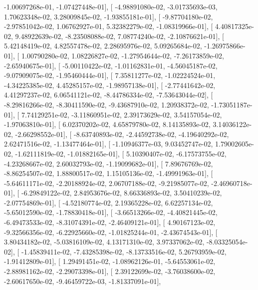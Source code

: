 \documentclass{article}
\begin{document}
         -1.00697268e-01,  -1.07427448e-01],
       [ -4.98891080e-02,  -3.01735693e-03,   1.70623348e-02,
          3.28009845e-02,  -1.93855181e-01],
       [ -9.87704180e-02,  -2.97851042e-02,   1.06762927e-01,
          5.32382279e-02,  -1.08319966e-01],
       [  4.40817325e-02,   9.48922639e-02,  -8.23508088e-02,
          7.08774240e-02,  -2.10876621e-01],
       [  5.42148419e-02,   4.82557478e-02,   2.28695976e-02,
          5.09265684e-02,  -1.26975866e-01],
       [  1.00790280e-02,   1.08226827e-02,  -1.27954644e-02,
         -7.26173859e-02,  -2.65940675e-01],
       [ -5.00110422e-02,  -1.01162831e-01,  -4.56045187e-02,
         -9.07909075e-02,  -1.95460444e-01],
       [  7.35811277e-02,  -1.02224524e-01,  -4.34225385e-02,
          4.45285157e-02,  -1.98957138e-01],
       [ -2.77441642e-02,   4.41297237e-02,   6.06541121e-02,
         -8.44786334e-02,  -7.53643044e-02],
       [ -8.29816266e-02,  -8.30411590e-02,  -9.43687910e-02,
          1.20938372e-02,  -1.73051187e-01],
       [  7.74129251e-02,  -3.11860951e-02,   2.39173629e-02,
          3.54157054e-02,  -1.97063810e-01],
       [  6.02370202e-02,   4.65879780e-02,   8.14135893e-02,
          3.14036122e-02,  -2.66298552e-01],
       [ -8.63740893e-02,  -2.44592738e-02,  -4.19640292e-02,
          2.62471516e-02,  -1.13477464e-01],
       [ -1.10946377e-03,   9.03452747e-02,   1.79002605e-02,
         -1.62111819e-02,  -1.01882165e-01],
       [  5.10390407e-02,  -6.17573755e-02,  -4.23268667e-02,
          2.60032793e-02,  -1.19099682e-01],
       [  7.89676769e-02,  -8.86254507e-02,   1.88800517e-02,
          1.15105136e-02,  -1.49991963e-01],
       [ -5.64611171e-02,  -2.20188924e-02,   2.06707188e-02,
         -9.21985077e-02,  -2.46960718e-01],
       [ -6.29849122e-02,   2.84953676e-02,   8.66336893e-02,
          3.50410239e-02,  -2.07754869e-01],
       [ -4.52180774e-02,   2.19365228e-02,   6.62257134e-02,
         -5.65012590e-02,  -1.78830418e-01],
       [ -3.66513266e-02,  -4.40821445e-02,  -6.49473533e-02,
         -8.31074391e-02,  -2.46409121e-01],
       [  4.90167123e-02,  -9.32566356e-02,  -6.22925660e-02,
         -1.01825244e-01,  -2.43674543e-01],
       [  3.80434182e-02,  -5.03816109e-02,   4.13171310e-02,
          3.97337062e-02,  -8.03325054e-02],
       [ -1.45839411e-02,  -7.43285398e-02,  -8.13733516e-02,
          5.26793959e-02,  -1.91412809e-01],
       [  1.29491451e-02,  -1.08962126e-01,  -5.64553061e-02,
         -2.88981162e-02,  -2.29073398e-01],
       [  2.39122699e-02,  -3.76038600e-02,  -2.60617650e-02,
         -9.46459722e-03,  -1.81337091e-01],
\end{document}
